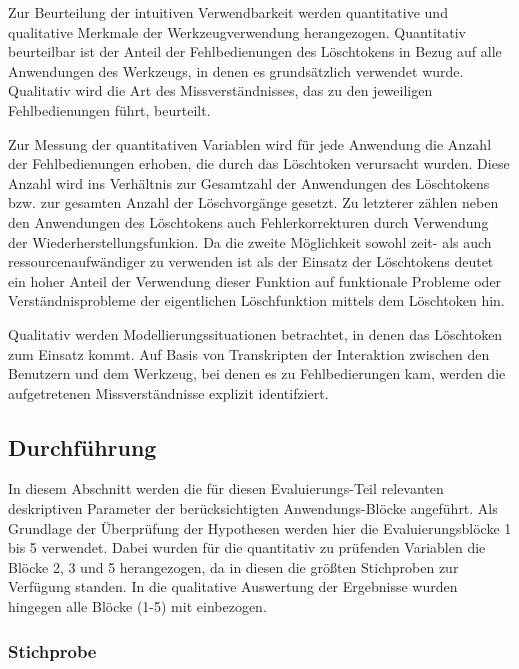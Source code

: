 Zur Beurteilung der intuitiven Verwendbarkeit werden quantitative und qualitative Merkmale der Werkzeugverwendung herangezogen. Quantitativ beurteilbar ist der Anteil der Fehlbedienungen des Löschtokens in Bezug auf alle Anwendungen des Werkzeugs, in denen es grundsätzlich verwendet wurde. Qualitativ wird die Art des Missverständnisses, das zu den jeweiligen Fehlbedienungen führt, beurteilt.

Zur Messung der quantitativen Variablen wird für jede Anwendung die Anzahl der Fehlbedienungen erhoben, die durch das Löschtoken verursacht wurden. Diese Anzahl wird ins Verhältnis zur Gesamtzahl der Anwendungen des Löschtokens bzw. zur gesamten Anzahl der Löschvorgänge gesetzt. Zu letzterer zählen neben den Anwendungen des Löschtokens auch Fehlerkorrekturen durch Verwendung der Wiederherstellungsfunkion. Da die zweite Möglichkeit sowohl zeit- als auch ressourcenaufwändiger zu verwenden ist als der Einsatz der Löschtokens deutet ein hoher Anteil der Verwendung dieser Funktion auf funktionale Probleme oder Verständnisprobleme der eigentlichen Löschfunktion mittels dem Löschtoken hin.  

Qualitativ werden Modellierungssituationen betrachtet, in denen das Löschtoken zum Einsatz kommt. Auf Basis von Transkripten der Interaktion zwischen den Benutzern und dem Werkzeug, bei denen es zu Fehlbedierungen kam, werden die aufgetretenen Missverständnisse explizit identifziert.



\subsection{Durchführung} %
\label{sub:durchführung}

In diesem Abschnitt werden die für diesen Evaluierungs-Teil relevanten deskriptiven Parameter der berücksichtigten Anwendungs-Blöcke angeführt.
Als Grundlage der Überprüfung der Hypothesen werden hier die Evaluierungsblöcke 1 bis 5 verwendet. Dabei wurden für die quantitativ zu prüfenden Variablen die Blöcke 2, 3 und 5 herangezogen, da in diesen die größten Stichproben zur Verfügung standen. In die qualitative Auswertung der Ergebnisse wurden hingegen alle Blöcke (1-5) mit einbezogen.

\subsubsection{Stichprobe} %


